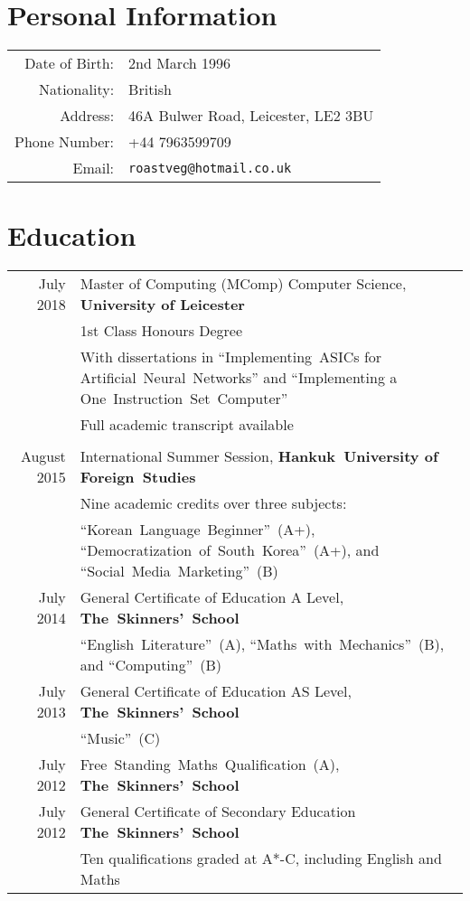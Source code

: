 \documentclass[a4paper]{article}
\begin{document}
\pagestyle{empty}
\par{ \par}

\section*{Personal Information}
\begin{tabular}{rl}
  Date of Birth: & 2nd March 1996 \\
  Nationality: & British \\
  Address: & 46A Bulwer Road, Leicester, LE2 3BU \\
  Phone Number: & +44 7963599709 \\
  Email: & \texttt{roastveg@hotmail.co.uk}
\end{tabular}

\section*{Education}
\begin{tabular}{rp{11.75cm}}
  July 2018 & Master of Computing (MComp) Computer Science, \textbf{University of Leicester} \\
  & 1st Class Honours Degree \\
  & With dissertations in ``Implementing~ASICs for Artificial~Neural~Networks'' and ``Implementing a One~Instruction~Set~Computer'' \\
  & Full academic transcript available \\
  \multicolumn{2}{c}{} \\
  
  August 2015 & International Summer Session, \textbf{Hankuk~University of Foreign~Studies} \\
  & Nine academic credits over three subjects: \\
  & ``Korean~Language~Beginner''~(A+), ``Democratization~of~South~Korea''~(A+), and ``Social~Media~Marketing''~(B) \\
  
  July 2014 & General Certificate of Education A Level, \textbf{The~Skinners'~School} \\
  & ``English~Literature''~(A), ``Maths~with~Mechanics''~(B), and ``Computing''~(B) \\
  July 2013 & General Certificate of Education AS Level, \textbf{The~Skinners'~School} \\
  & ``Music''~(C) \\
  July 2012 & Free~Standing~Maths~Qualification~(A), \textbf{The~Skinners'~School} \\
  July 2012 & General Certificate of Secondary Education \textbf{The~Skinners'~School} \\
  & Ten qualifications graded at A*-C, including English and Maths
\end{tabular}
\end{document}
